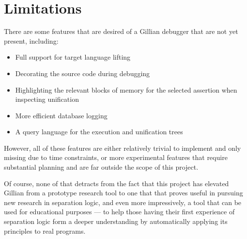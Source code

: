 
\section{Limitations}%
\label{sec:eval:limitations}

There are some features that are desired of a Gillian debugger that are not yet
present, including:
\begin{itemize}
  \item Full support for target language lifting
  \item Decorating the source code during debugging
  \item Highlighting the relevant blocks of memory for the selected assertion
        when inspecting unification
  \item More efficient database logging
  \item A query language for the execution and unification trees
\end{itemize}


However, all of these features are either relatively trivial to implement and
only missing due to time constraints, or more experimental features that require
substantial planning and are far outside the scope of this project.

Of course, none of that detracts from the fact that this project has elevated
Gillian from a prototype research tool to one that that proves useful in
pursuing new research in separation logic, and even more impressively, a tool
that can be used for educational purposes --- to help those having their first
experience of separation logic form a deeper understanding by automatically
applying its principles to real programs.
